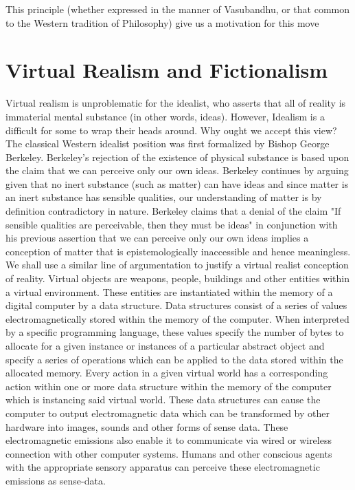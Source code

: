 This principle (whether expressed in the manner of Vasubandhu, or that common to the Western tradition of Philosophy) give us a motivation for this move


\section{Virtual Realism and Fictionalism}
Virtual realism is unproblematic for the idealist, who asserts that all of reality is immaterial mental substance (in other words, ideas). However, Idealism is a difficult for some to wrap their heads around. Why ought we accept this view? The classical Western idealist position was first formalized by Bishop George Berkeley. Berkeley's rejection of the existence of physical substance is based upon the claim that we can perceive only our own ideas. Berkeley continues by arguing given that no inert substance (such as matter) can have ideas and since \textbf{\textit{}}matter is an inert substance has sensible qualities, our understanding of matter is by definition contradictory in nature. Berkeley claims that a denial of the claim "If sensible qualities are perceivable, then they must be ideas" in conjunction with his previous assertion that we can perceive only our own ideas implies a conception of matter that is epistemologically inaccessible and hence meaningless. \cite{berkeley2003a}
\\

 We shall use a similar line of argumentation to justify a virtual realist conception of reality. Virtual objects are weapons, people, buildings and other entities within a virtual environment. These entities are instantiated within the memory of a digital computer by a data structure. Data structures consist of a series of values electromagnetically stored within the memory of the computer. When interpreted by a specific programming language, these values specify the number of bytes to allocate for a given instance or instances of a particular abstract object and specify a series of operations which can be applied to the data stored within the allocated memory. Every action in a given virtual world has a corresponding action within one or more data structure within the memory of the computer which is instancing said virtual world. These data structures can cause the computer to output electromagnetic data which can be transformed by other hardware into images, sounds and other forms of sense data. These electromagnetic emissions also enable it to communicate via wired or wireless connection with other computer systems. Humans and other conscious agents with the appropriate sensory apparatus can perceive these electromagnetic emissions as sense-data.
 \\
 
